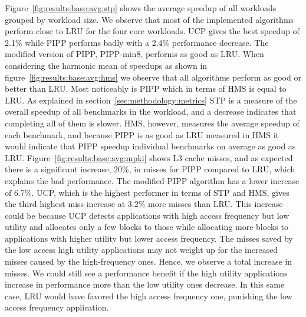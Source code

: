 Figure~\ref{fig:results:base:avg:stp} shows the average speedup of all workloads grouped by workload size.
We observe that most of the implemented algorithms perform close to LRU for the four core workloads.
UCP gives the best speedup of 2.1\% while PIPP performs badly with a 2.4\% performance decrease. 
The modified version of PIPP, PIPP-min8, performs as good as LRU.
When considering the harmonic mean of speedups as shown in figure~\ref{fig:results:base:avg:hms} we observe that all algorithms perform as good or better than LRU.  
Most noticeably is PIPP which in terms of HMS is equal to LRU.
As explained in section~\ref{sec:methodology:metrics} STP  is a measure of the overall speedup of all benchmarks in the workload, and a decrease indicates that completing all of them is slower.
HMS, however, measures the average speedup of each benchmark, and because PIPP is as good as LRU measured in HMS it would indicate that PIPP speedup individual benchmarks on average as good as LRU.
Figure~\ref{fig:results:base:avg:mpki} shows L3 cache misses, and as expected there is a significant increase, 20\%, in misses for PIPP compared to LRU, which explains the bad performance. 
The modified PIPP algorithm has a lower increase of 6.7\%.
UCP, which is the highest performer in terms of STP and HMS, gives the third highest miss increase at 3.2\% more misses than LRU. 
This increase could be because UCP detects applications with high access frequency but low utility and allocates only a few blocks to those while allocating more blocks to applications with higher utility but lower access frequency.
The misses saved by the low access high utility applications may not weight up for the increased misses caused by the high-frequency ones. 
Hence, we observe a total increase in misses.
We could still see a performance benefit if the high utility applications increase in performance more than the low utility ones decrease.
In this same case, LRU would have favored the high access frequency one, punishing the low access frequency application.

